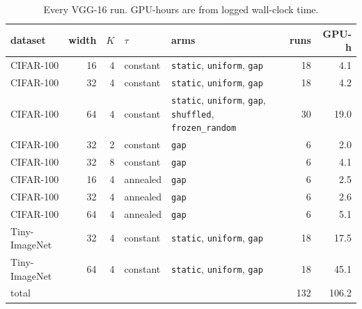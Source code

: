 \documentclass[10pt,a4paper]{article}
\begin{document}
\begin{table}[h]\centering\small
\caption{Every VGG-16 run. GPU-hours are from logged wall-clock time.}
\label{tab:vginvent}
\begin{tabular}{l r r l l r r}
\toprule
dataset & width & $K$ & $\tau$ & arms & runs & GPU-h \\
\midrule
CIFAR-100 & 16 & 4 & constant & \texttt{static}, \texttt{uniform}, \texttt{gap} & 18 & 4.1 \\
CIFAR-100 & 32 & 4 & constant & \texttt{static}, \texttt{uniform}, \texttt{gap} & 18 & 4.2 \\
CIFAR-100 & 64 & 4 & constant & \texttt{static}, \texttt{uniform}, \texttt{gap}, \texttt{shuffled}, \texttt{frozen\_random} & 30 & 19.0 \\
CIFAR-100 & 32 & 2 & constant & \texttt{gap} & 6 & 2.0 \\
CIFAR-100 & 32 & 8 & constant & \texttt{gap} & 6 & 4.1 \\
CIFAR-100 & 16 & 4 & annealed & \texttt{gap} & 6 & 2.5 \\
CIFAR-100 & 32 & 4 & annealed & \texttt{gap} & 6 & 2.6 \\
CIFAR-100 & 64 & 4 & annealed & \texttt{gap} & 6 & 5.1 \\
Tiny-ImageNet & 32 & 4 & constant & \texttt{static}, \texttt{uniform}, \texttt{gap} & 18 & 17.5 \\
Tiny-ImageNet & 64 & 4 & constant & \texttt{static}, \texttt{uniform}, \texttt{gap} & 18 & 45.1 \\
\midrule \multicolumn{5}{l}{total} & 132 & 106.2 \\
\bottomrule
\end{tabular}
\end{table}
\end{document}
